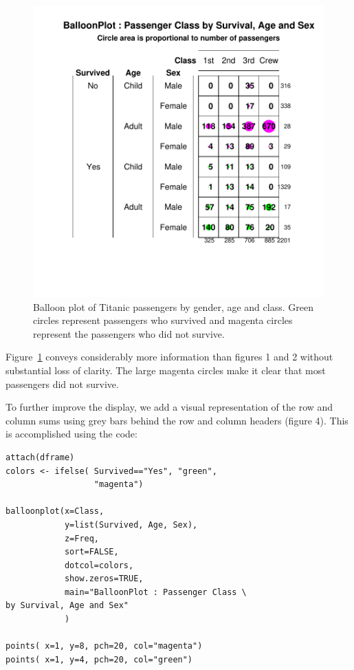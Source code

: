 \documentclass[a4paper]{report}
\begin{document}
\begin{article}
\begin{figure}
\includegraphics[width=\textwidth]{Figure3.pdf}
\caption{\label{figure:Figure3}
  Balloon plot of Titanic passengers by gender, age and class. Green
  circles represent passengers who survived and magenta circles
  represent the passengers who did not survive.}
\end{figure}

Figure~\ref{figure:Figure3} conveys considerably more information than
figures 1 and 2 without substantial loss of clarity. The large magenta
circles make it clear that most passengers did not survive.

To further improve the display, we add a visual representation of
the row and column sums using grey bars behind the row and column
headers (figure 4).  This is accomplished using the code:

{
\small
\begin{verbatim}
attach(dframe)
colors <- ifelse( Survived=="Yes", "green", 
                  "magenta")

balloonplot(x=Class,
            y=list(Survived, Age, Sex),
            z=Freq,
            sort=FALSE,
            dotcol=colors,
            show.zeros=TRUE,
            main="BalloonPlot : Passenger Class \
by Survival, Age and Sex"
            )

points( x=1, y=8, pch=20, col="magenta")
points( x=1, y=4, pch=20, col="green")


\end{verbatim}}
\end{article}
\end{document}
